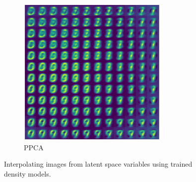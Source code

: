 \begin{figure}[H]
\begin{subfigure}[t]{0.49\textwidth}
		\centering
		\includegraphics[width = 0.8\textwidth]{figures/ppca/interpolation}
		\caption{PPCA}
		\label{fig:ppca:interpolation}
	\end{subfigure}
	\caption{Interpolating images from latent space variables using trained density models.}	
\end{figure}

